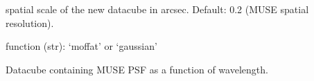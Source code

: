\documentclass[letterpaper,10pt,english]{sphinxmanual}
\begin{document}
\begin{fulllineitems}
\begin{description}
\begin{description}
\sphinxAtStartPar
spatial scale of the new datacube in arcsec. Default: 0.2 (MUSE
spatial resolution).

\end{description}

\sphinxAtStartPar
function (str): ‘moffat’ or ‘gaussian’

\begin{description}
\sphinxAtStartPar
Datacube containing MUSE PSF as a function of wavelength.

\end{description}

\end{description}

\end{fulllineitems}

\end{document}
